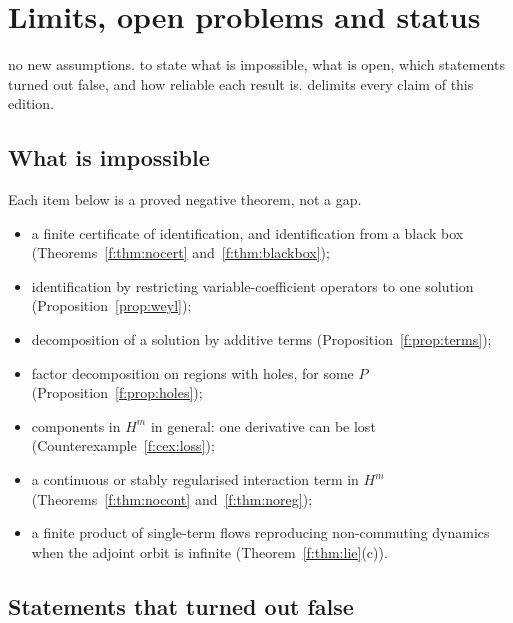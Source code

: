 \section{Limits, open problems and status}\label{f:ch:status}
\sectionbrief
{no new assumptions.}
{to state what is impossible, what is open, which statements turned out false, and how reliable each result is.}
{delimits every claim of this edition.}

\subsection{What is impossible}

Each item below is a proved negative theorem, not a gap.
\begin{itemize}
\item a finite certificate of identification, and identification from a black box (Theorems~\ref{f:thm:nocert} and~\ref{f:thm:blackbox});
\item identification by restricting variable-coefficient operators to one solution (Proposition~\ref{prop:weyl});
\item decomposition of a solution by additive terms (Proposition~\ref{f:prop:terms});
\item factor decomposition on regions with holes, for some $P$ (Proposition~\ref{f:prop:holes});
\item components in $H^m$ in general: one derivative can be lost (Counterexample~\ref{f:cex:loss});
\item a continuous or stably regularised interaction term in $H^m$ (Theorems~\ref{f:thm:nocont} and~\ref{f:thm:noreg});
\item a finite product of single-term flows reproducing non-commuting dynamics when the adjoint orbit is infinite (Theorem~\ref{f:thm:lie}(c)).
\end{itemize}

\subsection{Statements that turned out false}

